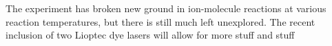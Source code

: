 The experiment has broken new ground in ion-molecule reactions at various reaction temperatures, but there is still much left unexplored. The recent inclusion of two Lioptec dye lasers will allow for more stuff and stuff